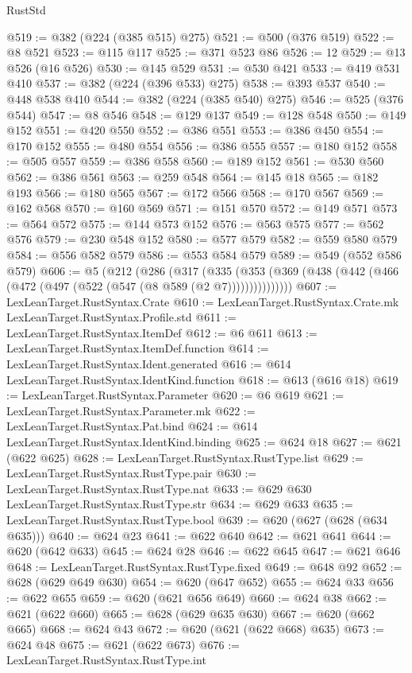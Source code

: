 \begin{lexlean}{RustStd}
\begin{coremodule}
@519 := @382 (@224 (@385 @515) @275)
@521 := @500 (@376 @519)
@522 := @8 @521
@523 := @115 @117
@525 := @371 @523 @86
@526 := 12
@529 := @13 @526 (@16 @526)
@530 := @145 @529
@531 := @530 @421
@533 := @419 @531 @410
@537 := @382 (@224 (@396 @533) @275)
@538 := @393 @537
@540 := @448 @538 @410
@544 := @382 (@224 (@385 @540) @275)
@546 := @525 (@376 @544)
@547 := @8 @546
@548 := @129 @137
@549 := @128 @548
@550 := @149 @152
@551 := @420 @550
@552 := @386 @551
@553 := @386 @450
@554 := @170 @152
@555 := @480 @554
@556 := @386 @555
@557 := @180 @152
@558 := @505 @557
@559 := @386 @558
@560 := @189 @152
@561 := @530 @560
@562 := @386 @561
@563 := @259 @548
@564 := @145 @18
@565 := @182 @193
@566 := @180 @565
@567 := @172 @566
@568 := @170 @567
@569 := @162 @568
@570 := @160 @569
@571 := @151 @570
@572 := @149 @571
@573 := @564 @572
@575 := @144 @573 @152
@576 := @563 @575
@577 := @562 @576
@579 := @230 @548 @152
@580 := @577 @579
@582 := @559 @580 @579
@584 := @556 @582 @579
@586 := @553 @584 @579
@589 := @549 (@552 @586 @579)
@606 := @5
    (@212
      (@286
        (@317
          (@335 (@353 (@369 (@438 (@442 (@466 (@472 (@497 (@522 (@547 (@8 @589 (@2 @7)))))))))))))))
@607 := LexLeanTarget.RustSyntax.Crate
@610 := LexLeanTarget.RustSyntax.Crate.mk LexLeanTarget.RustSyntax.Profile.std
@611 := LexLeanTarget.RustSyntax.ItemDef
@612 := @6 @611
@613 := LexLeanTarget.RustSyntax.ItemDef.function
@614 := LexLeanTarget.RustSyntax.Ident.generated
@616 := @614 LexLeanTarget.RustSyntax.IdentKind.function
@618 := @613 (@616 @18)
@619 := LexLeanTarget.RustSyntax.Parameter
@620 := @6 @619
@621 := LexLeanTarget.RustSyntax.Parameter.mk
@622 := LexLeanTarget.RustSyntax.Pat.bind
@624 := @614 LexLeanTarget.RustSyntax.IdentKind.binding
@625 := @624 @18
@627 := @621 (@622 @625)
@628 := LexLeanTarget.RustSyntax.RustType.list
@629 := LexLeanTarget.RustSyntax.RustType.pair
@630 := LexLeanTarget.RustSyntax.RustType.nat
@633 := @629 @630 LexLeanTarget.RustSyntax.RustType.str
@634 := @629 @633
@635 := LexLeanTarget.RustSyntax.RustType.bool
@639 := @620 (@627 (@628 (@634 @635)))
@640 := @624 @23
@641 := @622 @640
@642 := @621 @641
@644 := @620 (@642 @633)
@645 := @624 @28
@646 := @622 @645
@647 := @621 @646
@648 := LexLeanTarget.RustSyntax.RustType.fixed
@649 := @648 @92
@652 := @628 (@629 @649 @630)
@654 := @620 (@647 @652)
@655 := @624 @33
@656 := @622 @655
@659 := @620 (@621 @656 @649)
@660 := @624 @38
@662 := @621 (@622 @660)
@665 := @628 (@629 @635 @630)
@667 := @620 (@662 @665)
@668 := @624 @43
@672 := @620 (@621 (@622 @668) @635)
@673 := @624 @48
@675 := @621 (@622 @673)
@676 := LexLeanTarget.RustSyntax.RustType.int

\end{coremodule}
\end{lexlean}
